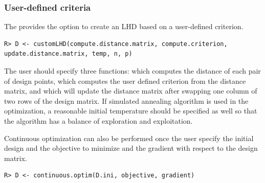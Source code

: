 \subsubsection{User-defined criteria}\label{sec:custom}
The  provides the option to create an LHD based on a user-defined criterion.
\begin{verbatim}
R> D <- customLHD(compute.distance.matrix, compute.criterion, 
update.distance.matrix, temp, n, p)
\end{verbatim}
The user should specify three functions:  which computes the distance of each pair of design points,  which computes the user defined criterion from the distance matrix, and  which will update the distance matrix after swapping one column of two rows of the design matrix. If simulated annealing algorithm is used in the optimization, a reasonable initial temperature  should be specified as well so that the algorithm has a balance of exploration and exploitation.

Continuous optimization can also be performed once the user specify the initial design  and the objective  to minimize and the gradient  with respect to the design matrix.
\begin{verbatim}
R> D <- continuous.optim(D.ini, objective, gradient)
\end{verbatim}

